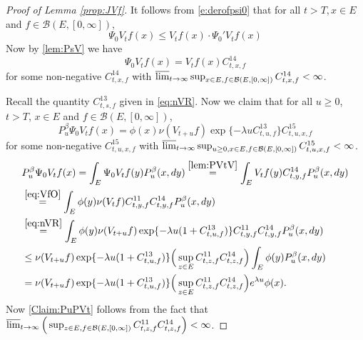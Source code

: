 \documentclass[12pt,a4paper]{amsart}
\numberwithin{equation}{section}
\theoremstyle{plain}
\theoremstyle{definition}
\theoremstyle{remark}
\begin{document}
\begin{proof}[Proof of Lemma \ref{prop:JVf}]
	It follows from \eqref{e:derofpsi0} that for all $t> T, x\in E$ and $f\in \mathcal B(E,[0,\infty])$,
\begin{equation}
	\Psi_0 V_t f (x)
	\leq V_tf(x)\cdot \Psi_0' V_t f(x)
	\end{equation}
		Now by \eqref{lem:PsV} we have
	\begin{equation} \label{lem:PVtV}
		\Psi_0 V_t f(x) = V_tf(x) C^{14}_{t,x,f}
\end{equation}
for some non-negative $C^{14}_{t,x,f}$ with $\varlimsup_{t\to \infty} \sup_{x\in E, f\in \mathcal B(E,[0,\infty])} C^{14}_{t,x,f} < \infty$.
		

Recall the quantity $C^{13}_{t,s,f}$ given in  \eqref{eq:nVR}.
	Now we claim that for all $u\geq 0$, $t>T$, $x\in E$ and $f\in \mathcal B(E,[0,\infty])$,
\begin{equation} \label{Claim:PuPVt}
        P_u^\beta \Psi_0 V_{t} f(x) = \phi(x)\nu(V_{t+u}f)
       \exp\{-\lambda u C^{13}_{t,u,f} \} C^{15}_{t,u,x,f}
\end{equation}
for some non-negative $C^{15}_{t,u,x,f}$ with $\varlimsup_{t\to \infty} \sup_{u\geq 0, x\in E, f\in \mathcal B(E,[0,\infty])} C^{15}_{t,u,x,f} < \infty$.
\begin{align}
	&P_u^\beta \Psi_0 V_{t} f(x)
	= \int_{E} \Psi_0V_tf(y) P_u^\beta (x,dy)
	\overset{\eqref{lem:PVtV}}=\int_{E} V_tf(y)
	C^{14}_{t,y,f} P_u^\beta (x,dy)
        \\&\overset{\eqref{eq:VfO}}=\int_{E} \phi(y)\nu(V_tf)
        C^{11}_{t,y,f}C^{14}_{t,y,f} P_u^\beta (x,dy)
\\&\overset{\eqref{eq:nVR}}=\int_{E} \phi(y)\nu(V_{t+u}f) \exp\{-\lambda u
(1+C^{13}_{t,u,f}) \} C^{11}_{t,y,f}C^{14}_{t,y,f} P_u^\beta (x,dy)
\\& \leq \nu(V_{t+u}f)
\exp\{-\lambda u (1+C^{13}_{t,u,f}) \} \Big(\sup_{z\in E} C^{11}_{t,z,f}C^{14}_{t,z,f}\Big)
\int_{E} \phi(y) P_u^\beta (x,dy)
\\& = \nu(V_{t+u}f)
\exp\{-\lambda u (1+C^{13}_{t,u,f}) \} \Big(\sup_{z\in E} C^{11}_{t,z,f}C^{14}_{t,z,f}\Big)
e^{\lambda u}\phi(x).
\end{align}
 Now \eqref{Claim:PuPVt} follows from the fact that $\varlimsup_{t\to \infty}
 \Big(\sup_{z\in E, f\in \mathcal B(E,[0,\infty])} C^{11}_{t,z,f} C^{14}_{t,z,f}\Big) < \infty$.


\end{proof}
\end{document}
